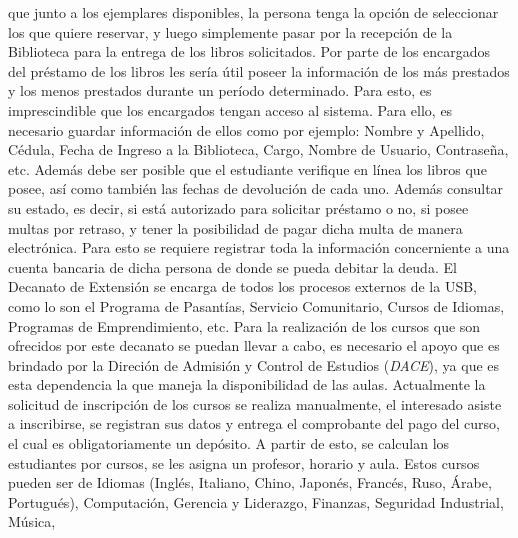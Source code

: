 \message{ !name(InformeFase2.tex)}\documentclass[12pt,a4paper,spanish]{article}
\begin{document}
que junto a los ejemplares disponibles, la persona tenga la opci\'on
de seleccionar los que quiere reservar, y luego simplemente pasar por
la recepci\'on de la Biblioteca para la entrega de los libros
solicitados.
\newline
\newline
\indent Por parte de los encargados del pr\'estamo de los libros
les ser\'ia \'util poseer la informaci\'on de los
m\'as prestados y los menos prestados durante un per\'iodo
determinado. Para esto, es imprescindible que los encargados tengan
acceso al sistema. Para ello, es necesario guardar informaci\'on de
ellos como por ejemplo: Nombre y Apellido, C\'edula, Fecha de Ingreso
a la Biblioteca, Cargo, Nombre de Usuario, Contrase\~na, etc. 
\newline
\newline
\indent Adem\'as debe ser posible que el estudiante
verifique en l\'inea los libros que posee, as\'i como tambi\'en las fechas
de devoluci\'on de cada uno. Adem\'as consultar su estado, es decir, si est\'a autorizado para solicitar pr\'estamo
o no, si posee multas por retraso, y tener la posibilidad de pagar
dicha multa de manera electr\'onica. Para esto se requiere registrar toda la
informaci\'on concerniente a una cuenta bancaria de dicha persona de
donde se pueda debitar la deuda.
\newline
\newline
\indent El Decanato de Extensi\'on se encarga de todos los procesos
externos de la USB, como lo son el Programa de Pasant\'ias, Servicio
Comunitario, Cursos de Idiomas, Programas de Emprendimiento, etc. Para
la realizaci\'on de los cursos que son ofrecidos por este decanato se
puedan llevar a cabo, es necesario el apoyo que es brindado por la
Direci\'on de Admisi\'on y Control de Estudios (\emph{DACE}), ya que
es esta dependencia la que maneja la disponibilidad de las aulas. 
\newline
\newline
\indent Actualmente la solicitud de inscripci\'on de los cursos se realiza
manualmente, el interesado asiste a inscribirse, se registran sus datos
y entrega el comprobante del pago del curso, el cual es obligatoriamente un
dep\'osito. A partir de esto, se calculan los estudiantes por
cursos, se les asigna un profesor, horario y aula.
\newline
\newline
\indent Estos cursos pueden ser de Idiomas (Ingl\'es, Italiano, Chino,
Japon\'es, Franc\'es, Ruso, \'Arabe, Portugu\'es), Computaci\'on,
Gerencia y Liderazgo, Finanzas, Seguridad Industrial, M\'usica,
\end{document}
